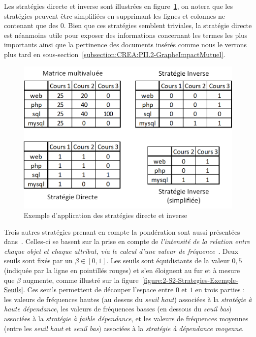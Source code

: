 \bigskip

Les stratégies directe et inverse sont illustrées en figure~\ref{figure:2-S2-Exemple-Strategies-Simples}, on notera que les stratégies peuvent être simplifiées en supprimant les lignes et colonnes ne contenant que des 0.
Bien que ces stratégies semblent triviales, la stratégie directe est néanmoins utile pour exposer des informations concernant les termes les plus importants ainsi que la pertinence des documents insérés comme nous le verrons plus tard en sous-section~\ref{subsection:CREA:PII.2-GrapheImpactMutuel}.


\begin{figure}[ht]
\centering
\includegraphics[scale=1]{2-Etat-de-l'Art/images/ACF/Strategies/exemple_strategies_simples.png}
\caption{Exemple d'application des stratégies directe et inverse}
\label{figure:2-S2-Exemple-Strategies-Simples}
\end{figure}

\bigskip

Trois autres stratégies prenant en compte la pondération sont aussi présentées dans~\cite{jaffal2015refinement}\cite{jaffal2019aide}.
Celles-ci se basent sur la prise en compte de \textit{l'intensité de la relation entre chaque objet et chaque attribut, via le calcul d'une valeur de fréquence}~\cite{jaffal2019aide}.
Deux seuils sont fixés par un $ \beta \in [0, 1] $.
Les seuils sont équidistants de la valeur $ 0,5 $ (indiquée par la ligne en pointillés rouges) et s'en éloignent au fur et à mesure que $ \beta $ augmente, comme illustré sur la figure~\ref{figure:2-S2-Strategies-Exemple-Seuils}.
Ces seuils permettent de découper l'espace entre $ 0 $ et $ 1 $ en trois parties : les valeurs de fréquences hautes (au dessus du \textit{seuil haut}) associées à la \textit{stratégie à haute dépendance}, les valeurs de fréquences basses (en dessous du \textit{seuil bas}) associées à la \textit{stratégie à faible dépendance}, et les valeurs de fréquences moyennes (entre les \textit{seuil haut} et \textit{seuil bas}) associées à la \textit{stratégie à dépendance moyenne}.

